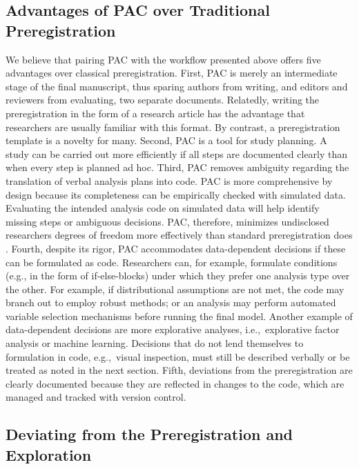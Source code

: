 \documentclass[psych,tutorial,accept,moreauthors,pdftex]{Definitions/mdpi}
\begin{document}
\begin{paracol}{2}
\subsection{Advantages of PAC over Traditional
Preregistration}\label{advantages-of-pac-over-traditional-preregistration}

We believe that pairing PAC with the workflow presented above offers
five advantages over classical preregistration. First, PAC is merely an
intermediate stage of the final manuscript, thus sparing authors from
writing, and editors and reviewers from evaluating, two separate
documents. Relatedly, writing the preregistration in the form of a
research article has the advantage that researchers are usually familiar
with this format. By contrast, a preregistration template is a novelty
for many. Second, PAC is a tool for study planning. A study can be
carried out more efficiently if all steps are documented clearly than
when every step is planned ad hoc. Third, PAC removes ambiguity
regarding the translation of verbal analysis plans into code. PAC is
more comprehensive by design because its completeness can be empirically
checked with simulated data. Evaluating the intended analysis code on
simulated data will help identify missing steps or ambiguous decisions.
PAC, therefore, minimizes undisclosed researchers degrees of freedom
more effectively than standard preregistration does
\citep{bakkerEnsuringQualitySpecificity2020, wichertsDegreesFreedomPlanning2016}.
Fourth, despite its rigor, PAC accommodates data-dependent decisions if
these can be formulated as code. Researchers can, for example, formulate
conditions (e.g., in the form of if-else-blocks) under which they prefer
one analysis type over the other. For example, if distributional
assumptions are not met, the code may branch out to employ robust
methods; or an analysis may perform automated variable selection
mechanisms before running the final model. Another example of
data-dependent decisions are more explorative analyses, i.e.,~explorative
factor analysis or machine learning. Decisions that do not lend
themselves to formulation in code, e.g.,~visual inspection, must still be
described verbally or be treated as noted in the next section. Fifth,
deviations from the preregistration are clearly documented because they
are reflected in changes to the code, which are managed and tracked with
version control.

\subsection{Deviating from the Preregistration and
Exploration}\label{deviating-from-the-preregistration-and-exploration}


\end{paracol}
\end{document}
